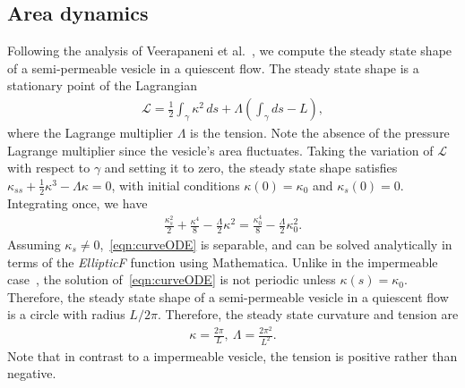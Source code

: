 \documentclass[9pt,twocolumn,twoside,lineno]{pnas-new}
\begin{document}
\subsection*{Area dynamics}
Following the analysis of Veerapaneni et al.~\cite{vee-raj-bir-pur2009},
we compute the steady state shape of a semi-permeable vesicle in a
quiescent flow. The steady state shape is a stationary point of the
Lagrangian
\begin{align}
  \mathcal{L} = \frac{1}{2}\int_{\gamma} \kappa^2 \, ds +
    \Lambda \left(\int_{\gamma} ds  - L \right),
\end{align}
where the Lagrange multiplier $\Lambda$ is the tension. Note the absence
of the pressure Lagrange multiplier since the vesicle's area fluctuates.
Taking the variation of $\mathcal{L}$ with respect to $\gamma$ and
setting it to zero, the steady state shape satisfies $\kappa_{ss} +
\frac{1}{2}\kappa^3 - \Lambda \kappa = 0$, with initial conditions
$\kappa(0) = \kappa_0$ and $\kappa_s(0) = 0$.  Integrating once, we have
\begin{align}
  \frac{\kappa_s^2}{2} + \frac{\kappa^4}{8} - 
    \frac{\Lambda}{2}\kappa^2 = \frac{\kappa_0^4}{8} - 
    \frac{\Lambda}{2}\kappa_0^2.
  \label{eqn:curveODE}
\end{align}
Assuming $\kappa_s \neq 0$,~\eqref{eqn:curveODE} is separable, and can
be solved analytically in terms of the {\em EllipticF} function using
Mathematica. Unlike in the impermeable case~\cite{vee-raj-bir-pur2009},
the solution of~\eqref{eqn:curveODE} is not periodic unless $\kappa(s) =
\kappa_0$. Therefore, the steady state shape of a semi-permeable vesicle
in a quiescent flow is a circle with radius $L/2\pi$. Therefore, the
steady state curvature and tension are
\begin{align}
  \kappa = \frac{2\pi}{L}, \: \Lambda = \frac{2\pi^2}{L^2}.
  \label{eqn:SSshape}
\end{align}
Note that in contrast to a impermeable vesicle, the tension is positive
rather than negative.
\end{document}
